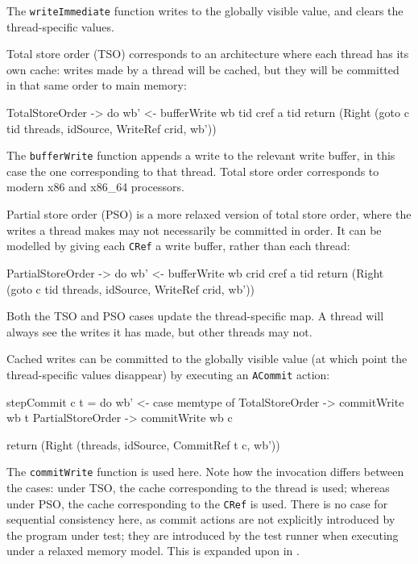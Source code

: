 The \verb|writeImmediate| function writes to the globally visible
value, and clears the thread-specific values.

Total store order (TSO) corresponds to an architecture where each
thread has its own cache: writes made by a thread will be cached, but
they will be committed in that same order to main memory:

\begin{haskellcode}
  TotalStoreOrder -> do
    wb' <- bufferWrite wb tid cref a tid
    return (Right
      (goto c tid threads, idSource, WriteRef crid, wb'))
\end{haskellcode}

The \verb|bufferWrite| function appends a write to the relevant write
buffer, in this case the one corresponding to that thread. Total store
order corresponds to modern x86 and x86\_64 processors.

Partial store order (PSO) is a more relaxed version of total store order,
where the writes a thread makes may not necessarily be committed in
order. It can be modelled by giving each \verb|CRef| a write buffer,
rather than each thread:

\begin{haskellcode}
  PartialStoreOrder -> do
    wb' <- bufferWrite wb crid cref a tid
    return (Right
      (goto c tid threads, idSource, WriteRef crid, wb'))
\end{haskellcode}

Both the TSO and PSO cases update the thread-specific map. A thread
will always see the writes it has made, but other threads may not.

Cached writes can be committed to the globally visible value (at which
point the thread-specific values disappear) by executing an
\verb|ACommit| action:

\begin{haskellcode}
stepCommit c t = do
  wb' <- case memtype of
    TotalStoreOrder   -> commitWrite wb t
    PartialStoreOrder -> commitWrite wb c

  return (Right (threads, idSource, CommitRef t c, wb'))
\end{haskellcode}

The \verb|commitWrite| function is used here. Note how the invocation
differs between the cases: under TSO, the cache corresponding to the
thread is used; whereas under PSO, the cache corresponding to the
\verb|CRef| is used. There is no case for sequential consistency here,
as commit actions are not explicitly introduced by the program under
test; they are introduced by the test runner when executing under a
relaxed memory model. This is expanded upon in
.

